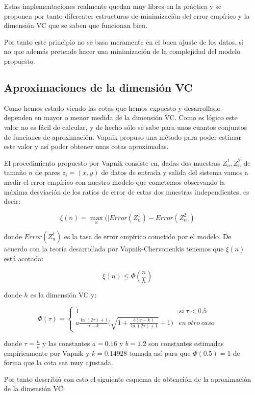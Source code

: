 Estas implementaciones realmente quedan muy libres en la práctica y se proponen por tanto diferentes estructuras de minimización del error empírico y la dimensión VC que se saben que funcionan bien.

Por tanto este principio no se basa meramente en el buen ajuste de los datos, si no que además pretende hacer una minimización de la complejidad del modelo propuesto.

\subsection{Aproximaciones de la dimensión VC}

Como hemos estado viendo las cotas que hemos expuesto y desarrollado dependen en mayor o menor medida de la dimensión VC. Como es lógico este valor no es fácil de calcular, y de hecho sólo se sabe para unos cuantos conjuntos de funciones de aproximación. Vapnik propuso una método para poder estimar este valor y así poder obtener unas cotas aproximadas.

El procedimiento propuesto por Vapnik consiste en, dadas dos muestras $Z_n^1 , Z_n^2$ de tamaño $n$ de pares $z_i = (x,y)$ de datos de entrada y salida del sistema vamos a medir el error empírico con nuestro modelo que cometemos observando la máxima desviación de los ratios de error de estas dos muestras independientes, es decir:

$$\xi (n) = \max_{\omega} (|Error(Z_n^1) - Error(Z_n^2|)$$

donde $Error(Z_n^i)$ es la tasa de error empírico cometido por el modelo. De acuerdo con la teoría desarrollada por Vapnik-Chervonenkis tenemos que $\xi (n)$ está acotada:

$$\xi (n) \leq \Phi (\frac{n}{h})$$

donde $h$ es la dimensión VC y:

\[ \Phi (\tau) = 
\begin{cases}
1 & si \ \tau <0.5 \\
a\frac{\ln (2\tau) + 1}{\tau - k} \bigg( \sqrt{1+\frac{b (\tau - k)}{\ln (2\tau) + 1}} + 1 \bigg) & en \ otro \ caso
\end{cases}
\]

donde $\tau = \frac{n}{h}$ y las constantes $a = 0.16$ y $b = 1.2$ son constantes estimadas empíricamente por Vapnik y $k = 0.14928$ tomada así para que $\Phi (0.5) = 1$ de forma que la cota sea muy ajustada.

Por tanto describió con esto el siguiente esquema de obtención de la aproximación de la dimensión VC:

